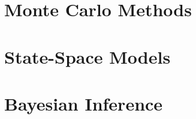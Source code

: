 \documentclass[12pt,a4paper,oneside]{memoir}
\theoremstyle{definition}
\begin{document}
	\chapter{Monte Carlo Methods}
	\label{chap:MCM}
	
	\chapter{State-Space Models}
	
	
	
	\chapter{Bayesian Inference}
	
	
	
	
	
	
	
	
	
	\appendix
	
	
	
	
	
\end{document}
